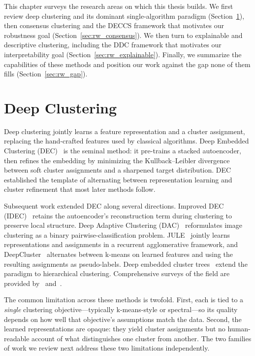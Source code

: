 This chapter surveys the research areas on which this thesis builds. We first review deep clustering and its dominant single-algorithm paradigm (Section~\ref{sec:rw_deep}), then consensus clustering and the DECCS framework that motivates our robustness goal (Section~\ref{sec:rw_consensus}). We then turn to explainable and descriptive clustering, including the DDC framework that motivates our interpretability goal (Section~\ref{sec:rw_explainable}). Finally, we summarize the capabilities of these methods and position our work against the gap none of them fills (Section~\ref{sec:rw_gap}).

\section{Deep Clustering}
\label{sec:rw_deep}

Deep clustering jointly learns a feature representation and a cluster assignment, replacing the hand-crafted features used by classical algorithms. Deep Embedded Clustering (DEC)~\citep{Xie2016} is the seminal method: it pre-trains a stacked autoencoder, then refines the embedding by minimizing the Kullback--Leibler divergence between soft cluster assignments and a sharpened target distribution. DEC established the template of alternating between representation learning and cluster refinement that most later methods follow.

Subsequent work extended DEC along several directions. Improved DEC (IDEC)~\citep{Guo2017} retains the autoencoder's reconstruction term during clustering to preserve local structure. Deep Adaptive Clustering (DAC)~\citep{Chang2017} reformulates image clustering as a binary pairwise-classification problem. JULE~\citep{Yang2016} jointly learns representations and assignments in a recurrent agglomerative framework, and DeepCluster~\citep{Caron2018} alternates between k-means on learned features and using the resulting assignments as pseudo-labels. Deep embedded cluster trees~\citep{Mautz2020} extend the paradigm to hierarchical clustering. Comprehensive surveys of the field are provided by~\citet{Min2018} and~\citet{Zhou2024}.

The common limitation across these methods is twofold. First, each is tied to a \emph{single} clustering objective---typically k-means-style or spectral---so its quality depends on how well that objective's assumptions match the data. Second, the learned representations are opaque: they yield cluster assignments but no human-readable account of what distinguishes one cluster from another. The two families of work we review next address these two limitations independently.

